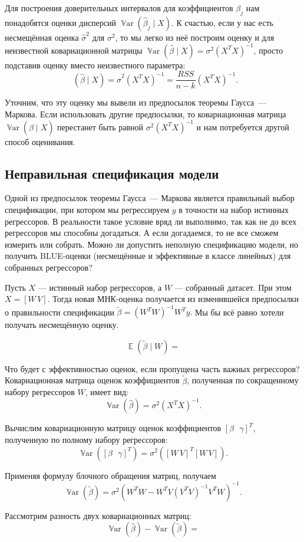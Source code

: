 \documentclass[12pt]{article}
\DeclareMathOperator{\Var}{\mathbb{V}ar}
\DeclareMathOperator{\hVar}{\widehat{\Var}}
\DeclareMathOperator{\E}{\mathbb{E}}
\renewcommand{\b}{\beta}
\newcommand{\hb}{\hat{\beta}}
\newcommand{\tb}{\tilde{\beta}}
\newcommand{\hs}{\hat{\sigma}}
\newcommand{\RSS}{RSS}
\begin{document}
Для построения доверительных интервалов для коэффициентов $\beta_j$ нам понадобятся оценки дисперсий $\Var(\hb_j \mid X)$.
К счастью, если у нас есть несмещённая оценка $\hs^2$ для $\sigma^2$, 
то мы легко из неё построим оценку и для неизвестной ковариационной матрицы $\Var(\hb \mid X) = \sigma^2 (X^T X)^{-1}$, просто подставив оценку вместо неизвестного параметра:
\[
\hVar(\hb \mid X) = \hs^2 (X^T X)^{-1} = \frac{\RSS}{n - k} (X^TX)^{-1}.
\]

Уточним, что эту оценку мы вывели из предпосылок теоремы Гаусса~— Маркова. 
Если использовать другие предпосылки, то ковариационная матрица $\Var(\hb \mid X)$ перестанет быть равной $\sigma^2 (X^TX)^{-1}$ и нам потребуется другой способ оценивания. 


\subsection{Неправильная спецификация модели}

Одной из предпосылок теоремы Гаусса~— Маркова является правильный выбор спецификации, при котором мы регрессируем $y$ в точности на набор истинных регрессоров. В реальности такое условие вряд ли выполнимо, так как не до всех регрессоров мы способны догадаться. А если догадаемся, то не все сможем измерить или собрать. Можно ли допустить неполную спецификацию модели, но получить BLUE-оценки (несмещённые и эффективные в классе линейных) для собранных регрессоров?

Пусть $X$ — истинный набор регрессоров, а $W$ — собранный датасет. 
При этом $X = [W \, V]$. Тогда новая МНК-оценка получается из изменившейся предпосылки о правильности спецификации $\tb = (W^T W)^{-1}W^T y.$ Мы бы всё равно хотели получать несмещённую оценку.

\[ \E(\tb \mid W) =  \]


Что будет с эффективностью оценок, если пропущена часть важных регрессоров?
Ковариационная матрица оценок коэффициентов $\tilde{\b}$, полученная по сокращенному набору регрессоров $W$, имеет вид:
\[
\Var(\hb) = \sigma^2(X^{T}X)^{-1}.
\]

Вычислим ковариационную матрицу оценок коэффициентов $[\beta \,\,\,\, \gamma]^{T}$, полученную по полному набору регрессоров:
\[
\Var([\beta \,\,\,\, \gamma]^{T}) = \sigma^2([W \, V]^{T}[W \, V]).
\]

Применяя формулу блочного обращения матриц, получаем
\[
\Var(\tb) = \sigma^2 (W^{T}W - W^{T}V(V^{T}V)^{-1}V^{T}W)^{-1}.
\]

Рассмотрим разность двух ковариационных матриц:
\[
\Var(\hb) - \Var(\tb) = 
\]
\end{document}
